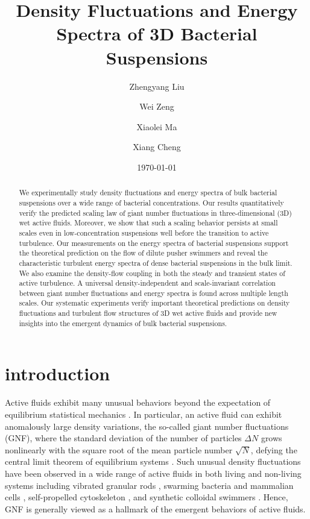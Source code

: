 \documentclass[twocolumn,aps,prx,amsmath,amssymb,longbibliography]{revtex4-2}
\begin{document}
\title{Density Fluctuations and Energy Spectra of 3D Bacterial Suspensions}

\author{Zhengyang Liu}
\author{Wei Zeng}
\author{Xiaolei Ma}
\author{Xiang Cheng}



\date{\today}


\begin{abstract}
We experimentally study density fluctuations and energy spectra of bulk bacterial suspensions over a wide range of bacterial concentrations. Our results quantitatively verify the predicted scaling law of giant number fluctuations in three-dimensional (3D) wet active fluids. Moreover, we show that such a scaling behavior persists at small scales even in low-concentration suspensions well before the transition to active turbulence. Our measurements on the energy spectra of bacterial suspensions support the theoretical prediction on the flow of dilute pusher swimmers and reveal the characteristic turbulent energy spectra of dense bacterial suspensions in the bulk limit. We also examine the density-flow coupling in both the steady and transient states of active turbulence. A universal density-independent and scale-invariant correlation between giant number fluctuations and energy spectra is found across multiple length scales. Our systematic experiments verify important theoretical predictions on density fluctuations and turbulent flow structures of 3D wet active fluids and provide new insights into the emergent dynamics of bulk bacterial suspensions.

\end{abstract}

\maketitle

\section{introduction}

Active fluids exhibit many unusual behaviors beyond the expectation of equilibrium statistical mechanics \cite{Ramaswamy2010,Cates2012,Marchetti2013,Poon2013,Elgeti2015}.
In particular, an active fluid can exhibit anomalously large density variations, the so-called giant number fluctuations (GNF), where the standard deviation of the number of particles $\Delta N$ grows nonlinearly with the square root of the mean particle number $\sqrt N$, defying the central limit theorem of equilibrium systems \cite{Mishin2015}.
Such unusual density fluctuations have been observed in a wide range of active fluids in both living and non-living systems including vibrated granular rods \cite{Narayan2007,Aranson2008,Kudrolli2008,Deseigne2010}, swarming bacteria \cite{Zhang2010,Nishiguchi2017} and mammalian cells \cite{Kawaguchi2017},
self-propelled cytoskeleton \cite{Schaller2013}, and synthetic colloidal swimmers \cite{Palacci2013,Karani2019}. Hence, GNF is generally viewed as a hallmark of the emergent behaviors of active fluids.
\end{document}
